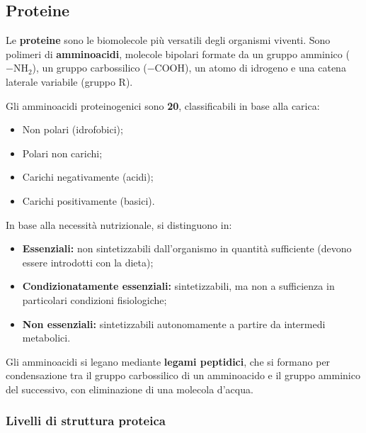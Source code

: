 \documentclass[11pt,a4paper,openright,twoside]{book}
\theoremstyle{definition}
\theoremstyle{plain}
\theoremstyle{remark}
\begin{document}
\subsection{Proteine}

Le \textbf{proteine} sono le biomolecole più versatili degli organismi viventi. Sono polimeri di \textbf{amminoacidi}, molecole bipolari formate da un gruppo amminico ($-\text{NH}_2$), un gruppo carbossilico ($-\text{COOH}$), un atomo di idrogeno e una catena laterale variabile (gruppo R).

Gli amminoacidi proteinogenici sono \textbf{20}, classificabili in base alla carica:
\begin{itemize}
  \item Non polari (idrofobici);
  \item Polari non carichi;
  \item Carichi negativamente (acidi);
  \item Carichi positivamente (basici).
\end{itemize}

In base alla necessità nutrizionale, si distinguono in:
\begin{itemize}
  \item \textbf{Essenziali:} non sintetizzabili dall'organismo in quantità sufficiente (devono essere introdotti con la dieta);
  \item \textbf{Condizionatamente essenziali:} sintetizzabili, ma non a sufficienza in particolari condizioni fisiologiche;
  \item \textbf{Non essenziali:} sintetizzabili autonomamente a partire da intermedi metabolici.
\end{itemize}

Gli amminoacidi si legano mediante \textbf{legami peptidici}, che si formano per condensazione tra il gruppo carbossilico di un amminoacido e il gruppo amminico del successivo, con eliminazione di una molecola d'acqua.

\subsubsection{Livelli di struttura proteica}
\end{document}
